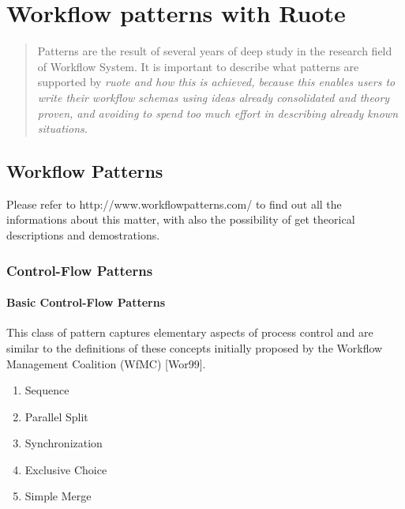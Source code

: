 
\chapter{Workflow patterns with Ruote}

\begin{quote}
Patterns are the result of several years of deep study in the research
field of Workflow System. It is important to describe what patterns are supported
by \em{ruote} and how this is achieved, because this enables users to write their 
workflow schemas using ideas already consolidated and theory proven, and avoiding
to spend too much effort in describing already known situations. 
\end{quote}


\section{Workflow Patterns}

Please refer to http://www.workflowpatterns.com/ to find out all the informations about
this matter, with also the possibility of get theorical descriptions and demostrations.

\subsection{Control-Flow Patterns}

\subsubsection{Basic Control-Flow Patterns}

This class of pattern captures elementary aspects of process control and are similar to the definitions of these concepts initially proposed by the Workflow Management Coalition (WfMC) [Wor99]. 

\begin{enumerate}
 \item Sequence 
 \item Parallel Split
 \item Synchronization
 \item Exclusive Choice
 \item Simple Merge
\end{enumerate}

